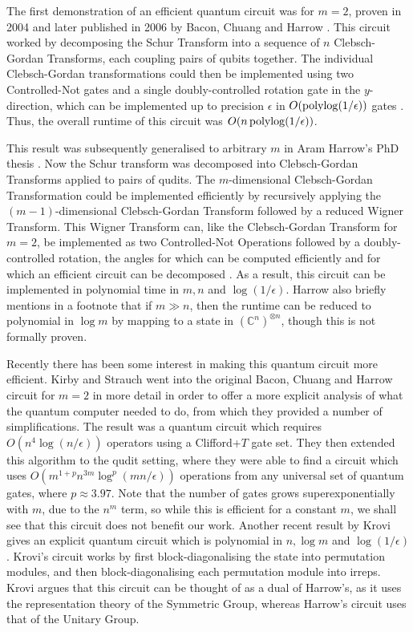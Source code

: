 The first demonstration of an efficient quantum circuit was for $m=2$, proven in 2004 and later published in 2006 by Bacon, Chuang and Harrow \cite{bacon2004}. This circuit worked by decomposing the Schur Transform into a sequence of $n$ Clebsch-Gordan Transforms, each coupling pairs of qubits together. The individual Clebsch-Gordan transformations could then be implemented using two Controlled-Not gates and a single doubly-controlled rotation gate in the $y$-direction, which can be implemented up to precision $\epsilon$ in $O(\operatorname{polylog}(1/\epsilon))$ gates \cite{dawson2006, nielsen2010}. Thus, the overall runtime of this circuit was $O(n\operatorname{polylog}(1/\epsilon))$.

This result was subsequently generalised to arbitrary $m$ in Aram Harrow's PhD thesis \cite{harrow2005, bacon2007}. Now the Schur transform was decomposed into Clebsch-Gordan Transforms applied to pairs of qudits. The $m$-dimensional Clebsch-Gordan Transformation could be implemented efficiently by recursively applying the $(m-1)$-dimensional Clebsch-Gordan Transform followed by a reduced Wigner Transform. This Wigner Transform can, like the Clebsch-Gordan Transform for $m=2$, be implemented as two Controlled-Not Operations followed by a doubly-controlled rotation, the angles for which can be computed efficiently and for which an efficient circuit can be decomposed \cite{nielsen2010}. As a result, this circuit can be implemented in polynomial time in $m, n$ and $\log(1/\epsilon)$. Harrow also briefly mentions in a footnote that if $m \gg n$, then the runtime can be reduced to polynomial in $\log m$ by mapping to a state in $(\mathbb{C}^n)^{\otimes n}$, though this is not formally proven.

Recently there has been some interest in making this quantum circuit more efficient. Kirby and Strauch \cite{kirby2018} went into the original Bacon, Chuang and Harrow circuit for $m=2$ in more detail in order to offer a more explicit  analysis of what the quantum computer needed to do, from which they provided a number of simplifications. The result was a quantum circuit which requires $O(n^4\log(n/\epsilon))$ operators using a Clifford+$T$ gate set. They then extended this algorithm to the qudit setting, where they were able to find a circuit which uses $O(m^{1+p}n^{3m}\log^p(mn/\epsilon))$ operations from any universal set of quantum gates, where $p\approx 3.97$. Note that the number of gates grows superexponentially with $m$, due to the $n^m$ term, so while this is efficient for a constant $m$, we shall see that this circuit does not benefit our work. Another recent result by Krovi \cite{Krovi2019} gives an explicit quantum circuit which is polynomial in $n, \log m$ and $\log(1/\epsilon)$. Krovi's circuit works by first block-diagonalising the state into permutation modules, and then block-diagonalising each permutation module into irreps. Krovi argues that this circuit can be thought of as a dual  of Harrow's, as it uses the representation theory of the Symmetric Group, whereas Harrow's circuit uses that of the Unitary Group.

